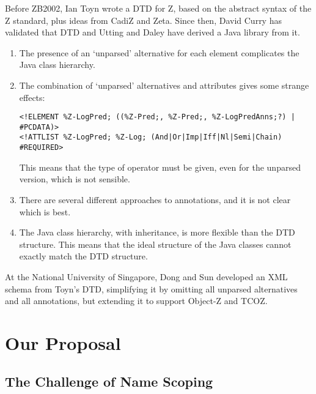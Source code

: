   Before ZB2002, Ian Toyn wrote a DTD for Z, based on the abstract
  syntax of the Z standard, plus ideas from CadiZ and Zeta.
  Since then, David Curry has validated that DTD and Utting and Daley
  have derived a Java library from it.


\begin{enumerate}
\item The presence of an `unparsed' alternative for each element
      complicates the Java class hierarchy.
\item The combination of `unparsed' alternatives and attributes
      gives some strange effects:
\begin{verbatim}
<!ELEMENT %Z-LogPred; ((%Z-Pred;, %Z-Pred;, %Z-LogPredAnns;?) | #PCDATA)>
<!ATTLIST %Z-LogPred; %Z-Log; (And|Or|Imp|Iff|Nl|Semi|Chain) #REQUIRED>
\end{verbatim}
      This means that the type of operator must be given,
      even for the unparsed version, which is not sensible. 
\item There are several different approaches to annotations,
        and it is not clear which is best.
\item The Java class hierarchy, with inheritance, is more flexible
        than the DTD structure.  This means that the ideal structure
        of the Java classes cannot exactly match the DTD
        structure. 
\end{enumerate}

  At the National University of Singapore, Dong and Sun developed an XML
  schema from Toyn's DTD, simplifying it by omitting all unparsed
  alternatives and all annotations, but extending it to support Object-Z
  and TCOZ.   


\section{Our Proposal}

\subsection{The Challenge of Name Scoping}

